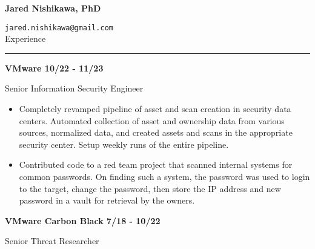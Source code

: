 \documentclass{letter}
\begin{document}
\newcommand{\vspc}{\vskip5mm}


\renewcommand\labelitemi{\raisebox{0.25ex}{\tiny$\bullet$}}

\textbf{\Huge{Jared Nishikawa, PhD}}

\texttt{jared.nishikawa@gmail.com} \\


\large{Experience}
\hrule

%
%

\textbf{VMware \hfill 10/22 - 11/23}

Senior Information Security Engineer

\begin{itemize}
    \setlength\itemsep{-0.5em}
    \item Completely revamped pipeline of asset and scan creation in security data centers.  Automated collection of asset and ownership data from various sources, normalized data, and created assets and scans in the appropriate security center.  Setup weekly runs of the entire pipeline.
    \item Contributed code to a red team project that scanned internal systems for common passwords.  On finding such a system, the password was used to login to the target, change the password, then store the IP address and new password in a vault for retrieval by the owners.
\end{itemize}

\textbf{VMware Carbon Black \hfill 7/18 - 10/22}

Senior Threat Researcher
\end{document}
